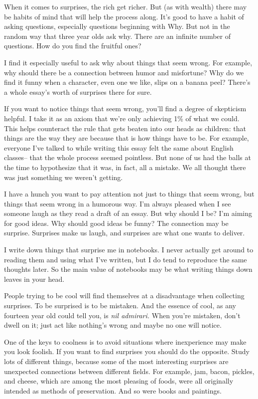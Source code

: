 \documentclass[12pt]{book}
\begin{document}
When it comes to surprises, the rich get richer. But (as with wealth)
there may be habits of mind that will help the process along. It's good
to have a habit of asking questions, especially questions beginning with
Why. But not in the random way that three year olds ask why. There are
an infinite number of questions. How do you find the fruitful ones?

I find it especially useful to ask why about things that seem wrong. For
example, why should there be a connection between humor and misfortune?
Why do we find it funny when a character, even one we like, slips on a
banana peel? There's a whole essay's worth of surprises there for sure.

If you want to notice things that seem wrong, you'll find a degree of
skepticism helpful. I take it as an axiom that we're only achieving 1\%
of what we could. This helps counteract the rule that gets beaten into
our heads as children: that things are the way they are because that is
how things have to be. For example, everyone I've talked to while
writing this essay felt the same about English classes-- that the whole
process seemed pointless. But none of us had the balls at the time to
hypothesize that it was, in fact, all a mistake. We all thought there
was just something we weren't getting.

I have a hunch you want to pay attention not just to things that seem
wrong, but things that seem wrong in a humorous way. I'm always pleased
when I see someone laugh as they read a draft of an essay. But why
should I be? I'm aiming for good ideas. Why should good ideas be funny?
The connection may be surprise. Surprises make us laugh, and surprises
are what one wants to deliver.

I write down things that surprise me in notebooks. I never actually get
around to reading them and using what I've written, but I do tend to
reproduce the same thoughts later. So the main value of notebooks may be
what writing things down leaves in your head.

People trying to be cool will find themselves at a disadvantage when
collecting surprises. To be surprised is to be mistaken. And the essence
of cool, as any fourteen year old could tell you, is \emph{nil
admirari.} When you're mistaken, don't dwell on it; just act like
nothing's wrong and maybe no one will notice.

One of the keys to coolness is to avoid situations where inexperience
may make you look foolish. If you want to find surprises you should do
the opposite. Study lots of different things, because some of the most
interesting surprises are unexpected connections between different
fields. For example, jam, bacon, pickles, and cheese, which are among
the most pleasing of foods, were all originally intended as methods of
preservation. And so were books and paintings.
\end{document}
